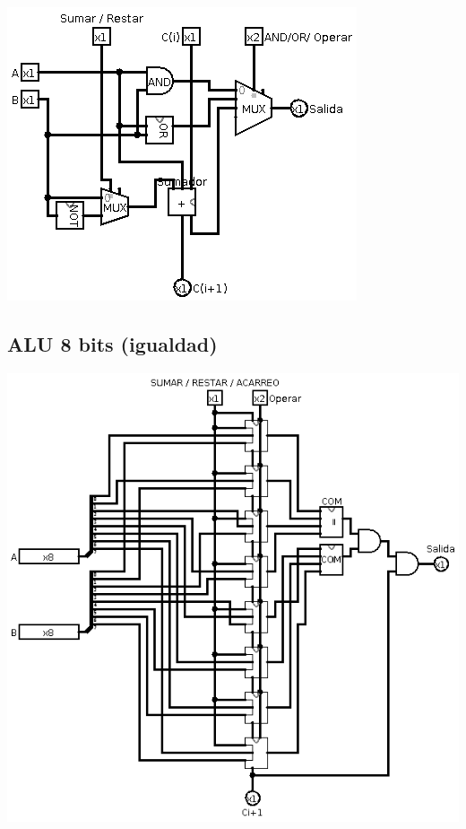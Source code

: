 \documentclass[12pt, letterpaper]{article}
\begin{document}
        \begin{center}
          \includegraphics[scale=0.6]{alu_res.png}
        \end{center}

      \subsection*{ALU 8 bits (igualdad)}

        \begin{center}
          \includegraphics[scale=0.5]{alu_eq.png}
        \end{center}
\end{document}
